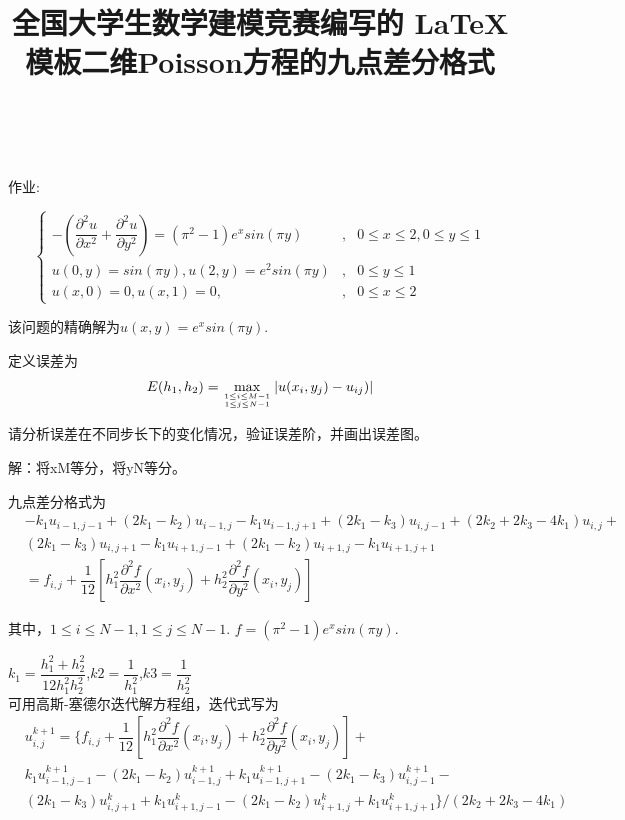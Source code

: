 \documentclass[withoutpreface,bwprint]{cumcmthesis} %
\title{全国大学生数学建模竞赛编写的 \LaTeX{} 模板}
\title{二维Poisson方程的九点差分格式}
\begin{document}
	\maketitle
	~\\
	~\\
	
	作业:
	
	$$
	\left\{
	\begin{array}{lcl}
	-(\dfrac{\partial^{2}{u}}{\partial{x^{2}}}+\dfrac{\partial^{2}{u}}{\partial{y^{2}}})=(\pi^{2}-1)e^{x}sin(\pi y) &,&0 \leq x \leq 2,0 \leq y \leq 1 \\
	
	u(0,y)=sin(\pi y),u(2,y)=e^{2}sin(\pi y) &, & 0 \leq y \leq 1 \\
	
	u(x,0)=0,u(x,1)=0,&, &0 \leq x \leq 2
	\end{array}
	\right.
	$$
	
	该问题的精确解为$ u(x,y)=e^{x}sin(\pi y)$.
	
	定义误差为$$ E(h_{1},h_{2})=\max \limits_{1 \leq i \leq M-1 \atop 1 \leq j \leq N-1 } |u(x_{i},y_{j})-u_{ij})| $$
	
	请分析误差在不同步长下的变化情况，验证误差阶，并画出误差图。

	
	
	解：将xM等分，将yN等分。
	
	九点差分格式为
	\begin{equation*}
	\begin{split}
	&-k_{1}u_{i-1,j-1}+(2k_{1}-k_{2})u_{i-1,j}-k_{1}u_{i-1,j+1}+(2k_{1}-k_{3})u_{i,j-1}+(2k_{2}+2k_{3}-4k_{1})u_{i,j} +\\
	&(2k_{1}-k_{3})u_{i,j+1}-k_{1}u_{i+1,j-1}+(2k_{1}-k_{2})u_{i+1,j}-k_{1}u_{i+1,j+1}\\
	&=f_{i,j}+\dfrac{1}{12}[h_{1}^{2}\dfrac{\partial^{2}{f}}{\partial{x}^{2}}(x_{i},y_{j})+h_{2}^{2}\dfrac{\partial^{2}{f}}{\partial{y}^{2}}(x_{i},y_{j})]
	\end{split}
	\end{equation*}
	
	其中，$ 1 \leq i \leq N-1 ,1 \leq j \leq N-1 $.
	$f=(\pi^{2}-1)e^{x}sin(\pi y)$.
	
	$k_{1}=\dfrac{h_{1}^{2}+h_{2}^{2}}{12h_{1}^{2}h_{2}^{2}}$,$k2=\dfrac{1}{h_{1}^{2}}$,$ k3=\dfrac{1}{h_{2}^{2}} $
    ~\\
    
	可用高斯-塞德尔迭代解方程组，迭代式写为
	\begin{equation*}
	\begin{split}
		&u_{i,j}^{k+1}=\{f_{i,j}+\dfrac{1}{12}[h_{1}^{2}\dfrac{\partial^{2}{f}}{\partial{x}^{2}}(x_{i},y_{j})+h_{2}^{2}\dfrac{\partial^{2}{f}}{\partial{y}^{2}}(x_{i},y_{j})]+\\
		&k_{1}u_{i-1,j-1}^{k+1}-(2k_{1}-k_{2})u_{i-1,j}^{k+1}+k_{1}u_{i-1,j+1}^{k+1}-(2k_{1}-k_{3})u_{i,j-1}^{k+1}-\\
		&(2k_{1}-k_{3})u_{i,j+1}^{k}+k_{1}u_{i+1,j-1}^{k}-(2k_{1}-k_{2})u_{i+1,j}^{k}+k_{1}u_{i+1,j+1}^{k} \}/ (2k_{2}+2k_{3}-4k_{1})
	\end{split}
	\end{equation*}
\end{document}
